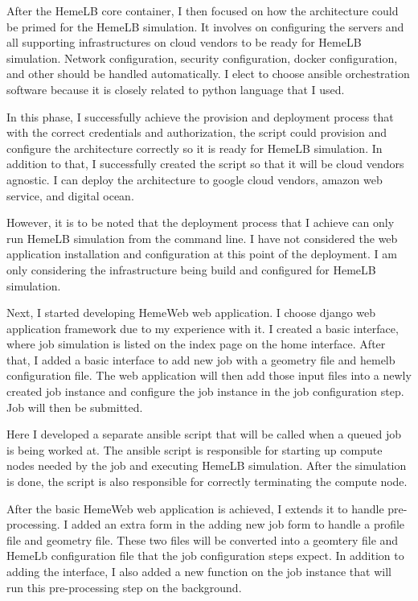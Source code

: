 After the HemeLB core container, I then focused on how the architecture could be primed for the HemeLB simulation. It involves on configuring the servers and all supporting infrastructures on cloud vendors to be ready for HemeLB simulation. Network configuration, security configuration, docker configuration, and other should be handled automatically. I elect to choose ansible orchestration software because it is closely related to python language that I used. 

In this phase, I successfully achieve the provision and deployment process that with the correct credentials and authorization, the script could provision and configure the architecture correctly so it is ready for HemeLB simulation. In addition to that, I successfully created the script so that it will be cloud vendors agnostic. I can deploy the architecture to google cloud vendors, amazon web service, and digital ocean.

However, it is to be noted that the deployment process that I achieve can only run HemeLB simulation from the command line. I have not considered the web application installation and configuration at this point of the deployment. I am only considering the infrastructure being build and configured for HemeLB simulation.


Next, I started developing HemeWeb web application. I choose django web application framework due to my experience with it. I created a basic interface, where job simulation is listed on the index page on the home interface. After that, I added a basic interface to add new job with a geometry file and hemelb configuration file. The web application will then add those input files into a newly created job instance and configure the job instance in the job configuration step. Job will then be submitted. 

Here I developed a separate ansible script that will be called when a queued job is being worked at. The ansible script is responsible for starting up compute nodes needed by the job and executing HemeLB simulation. After the simulation is done, the script is also responsible for correctly terminating the compute node.

After the basic HemeWeb web application is achieved, I extends it to handle pre-processing. I added an extra form in the adding new job form to handle a profile file and geometry file. These two files will be converted into a geomtery file and HemeLb configuration file that the job configuration steps expect. In addition to adding the interface, I also added a new function on the job instance that will run this pre-processing step on the background. 

